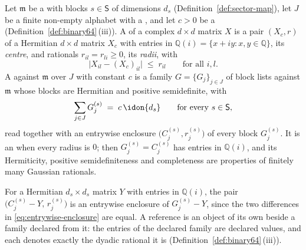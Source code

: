 \begin{definition}\label{def:exact-reference}
Let $\mathfrak{m}$ be a  with blocks $s\in\mathsf{S}$ of
dimensions $d_s$ (Definition~\ref{def:sector-map}), let $J$ be a finite
non-empty alphabet with a , and let $c>0$ be a
 (Definition~\ref{def:binary64}\,(iii)). A
 of a complex $d\times d$ matrix
$X$ is a pair $(X_c,r)$ of a Hermitian $d\times d$ matrix $X_c$ with entries
in $\mathbb{Q}(i)=\{x+iy:x,y\in\mathbb{Q}\}$, its \emph{centre}, and
rationals $r_{il}=r_{li}\ge0$, its \emph{radii}, with
\begin{equation}\label{eq:entrywise-enclosure}
  \big|X_{il}-(X_c)_{il}\big|\;\le\;r_{il}\qquad\text{for all }i,l .
\end{equation}
A  against $\mathfrak{m}$ over $J$
with constant $c$ is a family $G=\{G_j\}_{j\in J}$ of block lists against
$\mathfrak{m}$ whose blocks are Hermitian and positive semidefinite, with
\begin{equation}\label{eq:reference-complete}
  \sum_{j\in J}G^{(s)}_j\;=\;c\,\idon{d_s}\qquad\text{for every }s\in\mathsf{S},
\end{equation}
read together with an entrywise enclosure $\big(C^{(s)}_j,r^{(s)}_j\big)$ of
every block $G^{(s)}_j$. It is an
 when every radius is $0$; then
$G^{(s)}_j=C^{(s)}_j$ has entries in $\mathbb{Q}(i)$, and its Hermiticity,
positive semidefiniteness and completeness are properties of finitely many
Gaussian rationals.

For a Hermitian $d_s\times d_s$ matrix $Y$ with entries in $\mathbb{Q}(i)$,
the pair $\big(C^{(s)}_j-Y,\,r^{(s)}_j\big)$ is an entrywise enclosure of
$G^{(s)}_j-Y$, since the two differences in \eqref{eq:entrywise-enclosure}
are equal. A reference is an object of its own beside a family declared from
it: the entries of the declared family are declared values, and each denotes
exactly the dyadic rational it is (Definition~\ref{def:binary64}\,(iii)).
\end{definition}
